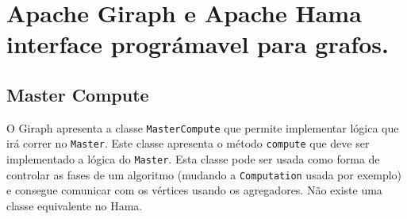 \chapter{Apache Giraph e Apache Hama interface prográmavel para grafos.}

\section{Master Compute}

O Giraph apresenta a classe \texttt{MasterCompute} que permite implementar lógica que irá correr no \texttt{Master}. Este classe apresenta o método \texttt{compute} que deve ser implementado a lógica do \texttt{Master}. Esta classe pode ser usada como forma de controlar as fases de um algoritmo (mudando a \texttt{Computation} usada por exemplo) e consegue comunicar com os vértices usando os agregadores. Não existe uma classe equivalente no Hama.











